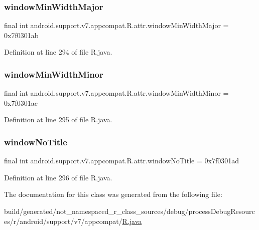 \subsubsection{\texorpdfstring{windowMinWidthMajor}{windowMinWidthMajor}}
{\footnotesize\ttfamily final int android.\+support.\+v7.\+appcompat.\+R.\+attr.\+window\+Min\+Width\+Major = 0x7f0301ab\hspace{0.3cm}{\ttfamily [static]}}



Definition at line 294 of file R.\+java.

\mbox{\label{classandroid_1_1support_1_1v7_1_1appcompat_1_1_r_1_1attr_a42559736432f294a82fae05e842c36f6}} 
\subsubsection{\texorpdfstring{windowMinWidthMinor}{windowMinWidthMinor}}
{\footnotesize\ttfamily final int android.\+support.\+v7.\+appcompat.\+R.\+attr.\+window\+Min\+Width\+Minor = 0x7f0301ac\hspace{0.3cm}{\ttfamily [static]}}



Definition at line 295 of file R.\+java.

\mbox{\label{classandroid_1_1support_1_1v7_1_1appcompat_1_1_r_1_1attr_a46ea84cd8ac398f0d99f1ff7f0e2d100}} 
\subsubsection{\texorpdfstring{windowNoTitle}{windowNoTitle}}
{\footnotesize\ttfamily final int android.\+support.\+v7.\+appcompat.\+R.\+attr.\+window\+No\+Title = 0x7f0301ad\hspace{0.3cm}{\ttfamily [static]}}



Definition at line 296 of file R.\+java.



The documentation for this class was generated from the following file\+:\begin{DoxyCompactItemize}
\item 
build/generated/not\+\_\+namespaced\+\_\+r\+\_\+class\+\_\+sources/debug/process\+Debug\+Resources/r/android/support/v7/appcompat/\mbox{\hyperlink{android_2support_2v7_2appcompat_2_r_8java}{R.\+java}}\end{DoxyCompactItemize}
